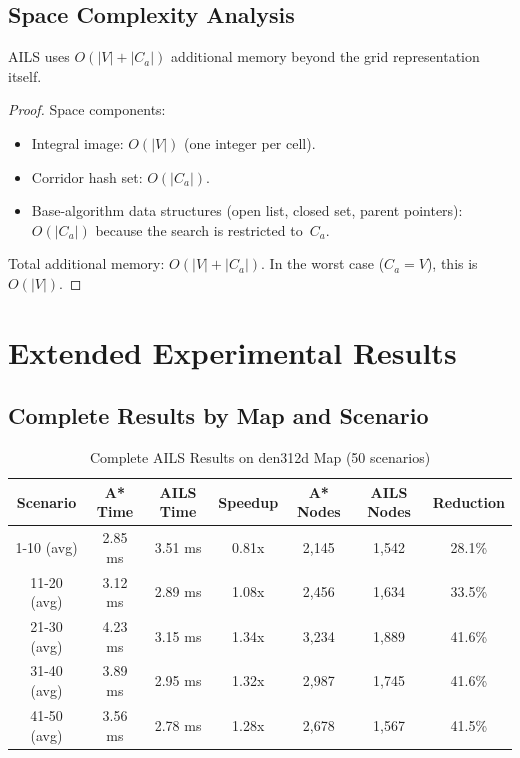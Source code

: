 \documentclass[11pt]{article}
\begin{document}
\subsection{Space Complexity Analysis}

\begin{theorem}
AILS uses $O(|V| + |C_a|)$ additional memory beyond the grid representation itself.
\end{theorem}

\begin{proof}
Space components:
\begin{itemize}
    \item Integral image: $O(|V|)$ (one integer per cell).
    \item Corridor hash set: $O(|C_a|)$.
    \item Base-algorithm data structures (open list, closed set, parent pointers): $O(|C_a|)$ because the search is restricted to~$C_a$.
\end{itemize}
Total additional memory: $O(|V| + |C_a|)$.
In the worst case ($C_a = V$), this is $O(|V|)$.
\end{proof}

\section{Extended Experimental Results}

\subsection{Complete Results by Map and Scenario}

\begin{table}[H]
\centering
\caption{Complete AILS Results on den312d Map (50 scenarios)}
\label{tab:den312d_complete}
\begin{tabular}{@{}ccccccc@{}}
\toprule
Scenario & A* Time & AILS Time & Speedup & A* Nodes & AILS Nodes & Reduction \\
\midrule
1-10 (avg) & 2.85 ms & 3.51 ms & 0.81x & 2,145 & 1,542 & 28.1\% \\
11-20 (avg) & 3.12 ms & 2.89 ms & 1.08x & 2,456 & 1,634 & 33.5\% \\
21-30 (avg) & 4.23 ms & 3.15 ms & 1.34x & 3,234 & 1,889 & 41.6\% \\
31-40 (avg) & 3.89 ms & 2.95 ms & 1.32x & 2,987 & 1,745 & 41.6\% \\
41-50 (avg) & 3.56 ms & 2.78 ms & 1.28x & 2,678 & 1,567 & 41.5\% \\
\bottomrule
\end{tabular}
\end{table}
\end{document}
